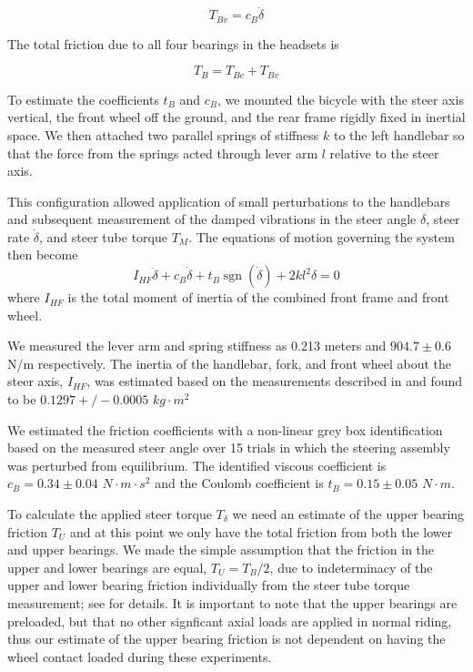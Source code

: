 \documentclass[10pt]{article}
\begin{document}
\begin{equation}
  \label{eq:viscous}
  T_{Bv} = c_B \dot{\delta}
\end{equation}

The total friction due to all four bearings in the headsets is

\begin{equation}
  T_B = T_{Bc} + T_{Bv}
\end{equation}

To estimate the coefficients $t_B$ and $c_B$, we mounted the bicycle with the
steer axis vertical, the front wheel off the ground, and the rear frame rigidly
fixed in inertial space. We then attached two parallel springs of stiffness $k$
to the left handlebar so that the force from the springs acted through lever
arm $l$ relative to the steer axis.


This configuration allowed application of small perturbations to the handlebars
and subsequent measurement of the damped vibrations in the steer angle
$\delta$, steer rate $\dot{\delta}$, and steer tube torque $T_M$. The equations
of motion governing the system then become
%
\begin{equation}
  I_{HF} \ddot{\delta} + c_B \dot{\delta} + t_B
  \operatorname{sgn}(\dot{\delta}) + 2 k l^2 \delta = 0
\end{equation}
%
where $I_{HF}$ is the total moment of inertia of the combined front frame and
front wheel.

We measured the lever arm and spring stiffness as 0.213 meters and $904.7 \pm
0.6$ N/m respectively. The inertia of the handlebar, fork, and front wheel
about the steer axis, $I_{HF}$, was estimated based on the measurements
described in \cite{Moore2012} and found to be $0.1297+/-0.0005$ $kg\cdot m^2$

We estimated the friction coefficients with a non-linear grey box
identification based on the measured steer angle over 15 trials in which the
steering assembly was perturbed from equilibrium. The identified viscous
coefficient is $c_B = 0.34 \pm 0.04$ $N \cdot m \cdot s^2$ and the Coulomb
coefficient is $t_B = 0.15 \pm 0.05$ $N \cdot m$.

To calculate the applied steer torque $T_\delta$ we need an estimate of the
upper bearing friction $T_U$ and at this point we only have the total friction
from both the lower and upper bearings. We made the simple assumption that the
friction in the upper and lower bearings are equal, $T_U = T_B / 2$, due to
indeterminacy of the upper and lower bearing friction individually from the
steer tube torque measurement; see \cite{Moore2012} for details. It is
important to note that the upper bearings are preloaded, but that no other
signficant axial loads are applied in normal riding, thus our estimate of the
upper bearing friction is not dependent on having the wheel contact loaded
during these experiments.
\end{document}

